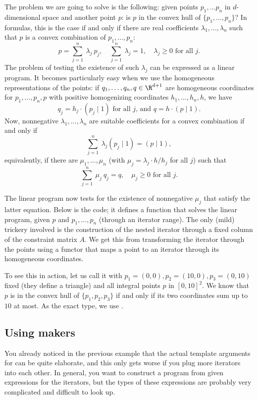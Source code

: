 The problem we are going to solve is the following: given points
$p_1,\ldots p_{n}$ in $d$-dimensional space and another point $p$: is
$p$ in the convex hull of $\{p_1,\ldots,p_{n}\}$? In formulas, this is
the case if and only if there are real coefficients
$\lambda_1,\ldots,\lambda_n$ such that $p$ is a convex combination of
$p_1,\ldots,p_n$: 
\[
p = \sum_{j=1}^{n}~\lambda_j~p_j, \quad \sum_{j=1}^{n}~\lambda_j = 1,
\quad \lambda_j \geq 0 \mbox{~for all $j$.}
\]
The problem of testing the existence of such $\lambda_j$ can 
be expressed as a linear program. It becomes particularly easy
when we use the homogeneous representations of the points: if
$q_1,\ldots,q_n,q\in\R^{d+1}$ are homogeneous coordinates for
$p_1,\ldots,p_n,p$ with positive homogenizing coordinates 
$h_1,\ldots,h_n,h$, we have
\[q_j = h_j \cdot (p_j \mid 1) \mbox{~for all $j$, and~} q = h \cdot
(p\mid 1).\] Now, nonnegative $\lambda_1,\ldots,\lambda_n$ are
suitable coefficients for a convex combination if and only if
\[\sum_{j=1}^n~ \lambda_j(p_j \mid 1) = (p\mid 1), \]
equivalently, if there are $\mu_1,\ldots,\mu_n$ 
(with $\mu_j = \lambda_j \cdot h/{h_j}$ for all $j$) such that
\[
\sum_{j=1}^n~\mu_j~q_j = q, \quad \mu_j \geq 0\mbox{~for all $j$}.
\]

The linear program now tests for the existence of nonnegative $\mu_j$
that satisfy the latter equation. Below is the code; it defines a
function that solves the linear program, given $p$ and
$p_1,\ldots,p_n$ (through an iterator range). The only (mild)
trickery involved is the construction of the nested iterator 
through a fixed column of the constraint matrix $A$. We get this
from transforming the iterator through the points using a functor 
that maps a point to an iterator through its homogeneous coordinates.


To see this in action, let us call it with $p_1=(0,0), p_2=(10,0),
p_3=(0,10)$ fixed (they define a triangle) and all integral points $p$
in $[0,10]^2$. We know that $p$ is in the convex hull of
$\{p_1,p_2,p_3\}$ if and only if its two coordinates sum up to $10$ at
most. As the exact type, we use .


\subsection{Using makers}
You already noticed in the previous example that the actual 
template arguments for 
can be quite elaborate, and this only gets worse if you plug more 
iterators into each other. In general, you want to construct a 
program from given expressions for the iterators, but the
types of these expressions are probably very complicated and 
difficult to look up. 

